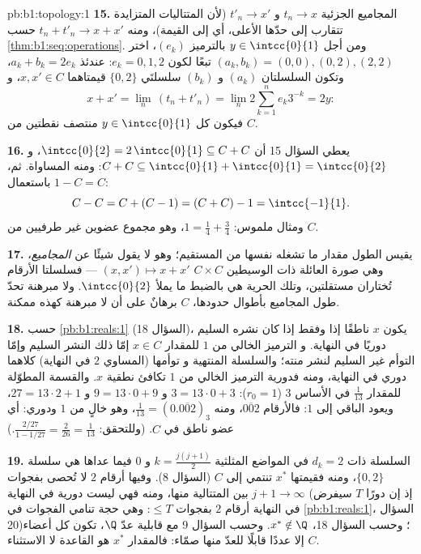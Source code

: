 \begin{solution}{pb:b1:topology:1}
\textbf{15.} المجاميع الجزئية $t_n \to x$ و $t'_n \to x'$
(لأن المتتاليات المتزايدة تتقارب إلى حدّها الأعلى، أي إلى
القيمة)، ومنه $t_n + t'_n \to x + x'$ حسب
\cref{thm:b1:seq:operations}. ومن أجل $y \in \intcc{0}{1}$ بالترميز
$(e_k)$، اختر $(a_k, b_k) = (0,0), (0,2), (2,2)$
تبعًا لكون $e_k = 0, 1, 2$: عندئذ $a_k + b_k = 2e_k$، وتكون
السلسلتان $(a_k)$ و $(b_k)$ سلسلتَي $\{0,2\}$ قيمتاهما $x,
x' \in C$، و
\[
x + x' = \lim_n\,(t_n + t'_n) = \lim_n 2\sum_{k=1}^n e_k 3^{-k}
= 2y :
\]
فيكون كل $y \in \intcc{0}{1}$ منتصف نقطتين من $C$.

\textbf{16.} يعطي السؤال 15 أن $\intcc{0}{2} = 2\,\intcc{0}{1}
\subseteq C + C$، و $C + C \subseteq \intcc{0}{1} +
\intcc{0}{1} = \intcc{0}{2}$: ومنه المساواة. ثم، باستعمال $1 - C = C$:
\[
C - C = C + (C - 1) = (C + C) - 1 = \intcc{-1}{1} .
\]
ومثال ملموس: $1 = \frac14 + \frac34$، وهو مجموع عضوين
غير طرفيين من $C$.

\textbf{17.} يقيس الطول مقدار ما تشغله  نفسها
من المستقيم؛ وهو لا يقول شيئًا عن  \emph{المجاميع}، وهي
صورة العائلة ذات الوسيطين $C \times C$  $(x,
x') \mapsto x + x'$ --- فسلسلتا الأرقام تُختاران
مستقلتين، وتلك الحرية هي بالضبط ما يملأ
$\intcc{0}{2}$. ولا مبرهنة تحدّ طول  المجاميع بأطوال
حدودها،  $C$ برهانٌ على أن لا مبرهنة كهذه ممكنة.

\textbf{18.} حسب \cref{pb:b1:reals:1} (السؤال 18)، يكون $x$
ناطقًا إذا وفقط إذا كان نشره السليم دوريًا في النهاية. و
الترميز الخالي من $1$ للمقدار $x \in C$ إمّا ذلك النشر السليم وإمّا
التوأم غير السليم لنشر منته؛ والسلسلة المنتهية و
توأمها (المساوي $2$ في النهاية) كلاهما دوري في النهاية،
ومنه فدورية الترميز الخالي من $1$ تكافئ
نطقية $x$. والقسمة المطوّلة للمقدار $\frac1{13}$ في الأساس $3$
($r_0 = 1$): $3 = 13\cdot0 + 3$ و $9 = 13\cdot0 + 9$ و $27 =
13\cdot2 + 1$، ويعود الباقي إلى $1$: فالأرقام
$\overline{002}$، ومنه $\frac1{13} = (0.\overline{002})_3$،
وهو خالٍ من $1$ ودوري: أي عضو ناطق في $C$. (وللتحقق:
$\frac{2/27}{1 - 1/27} = \frac{2}{26} = \frac1{13}$.)

\textbf{19.} السلسلة ذات $d_k = 2$ في المواضع
المثلثية $k = \frac{j(j+1)}{2}$ و $0$ فيما عداها هي
سلسلة $\{0,2\}$، ومنه فقيمتها $x^*$ تنتمي إلى $C$ (السؤال
8). وفيها أرقام $2$ لا تُحصى بفجوات $j + 1 \to \infty$
بين المتتالية منها، ومنه فهي ليست دورية في النهاية (إذ إن
دورًا $T$ سيفرض في النهاية أرقام $2$ بفجوات $\leq T$: وهي حجة
تنامي الفجوات في \cref{pb:b1:reals:1}، السؤال 20)؛ وحسب
السؤال 18، $x^* \notin \Q$. وحسب السؤال 9 مع
قابلية عدّ $\Q$، تكون كل أعضاء $C$ إلا عددًا قابلًا للعدّ منها
صمّاء: فالمقدار $x^*$ هو القاعدة لا الاستثناء.


\end{solution}
